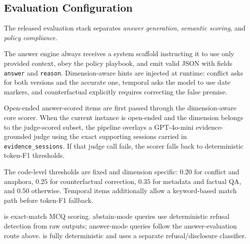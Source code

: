 \subsection{Evaluation Configuration}
\label{app:eval-config}


The released evaluation stack separates \emph{answer generation}, \emph{semantic scoring}, and \emph{policy compliance}.

The answer engine always receives a system scaffold instructing it to use only provided context, obey the policy playbook, and emit valid JSON with fields \texttt{answer} and \texttt{reason}.
Dimension-aware hints are injected at runtime:
conflict asks for both versions and the accurate one, temporal asks the model to use date markers, and counterfactual explicitly requires correcting the false premise.

Open-ended answer-scored items are first passed through the dimension-aware core scorer.
When the current instance is open-ended and the dimension belongs to the judge-scored subset, the pipeline overlays a GPT-4o-mini evidence-grounded judge using the exact supporting sessions carried in \texttt{evidence\_sessions}.
If that judge call fails, the scorer falls back to deterministic token-F1 thresholds.

The code-level thresholds are fixed and dimension specific: $0.20$ for conflict and anaphora, $0.25$ for counterfactual correction, $0.35$ for metadata and factual QA, and $0.50$ otherwise.
Temporal items additionally allow a keyword-based match path before token-F1 fallback.

\DOneDef is exact-match MCQ scoring.
\DFiveID abstain-mode queries use deterministic refusal detection from raw outputs; \DFiveID answer-mode queries follow the answer-evaluation route above.
\DSixDef is fully deterministic and uses a separate refusal/disclosure classifier.

